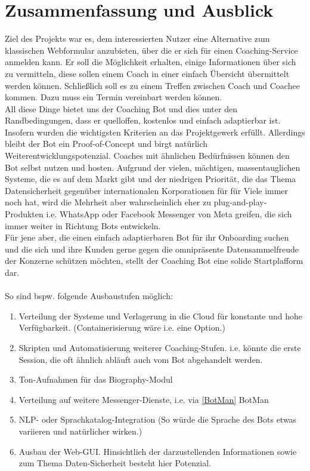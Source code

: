 \label{Zusammenfassung und Ausblick}
\chapter{Zusammenfassung und Ausblick}

    Ziel des Projekts war es, dem interessierten Nutzer eine Alternative zum klassischen Webformular anzubieten, über die er sich für einen Coaching-Service anmelden kann. Er soll die Möglichkeit erhalten, einige Informationen über sich zu vermitteln, diese sollen einem Coach in einer einfach Übersicht übermittelt werden können. Schließlich soll es zu einem Treffen zwischen Coach und Coachee kommen. Dazu muss ein Termin vereinbart werden können. \\
    All diese Dinge bietet uns der Coaching Bot und dies unter den Randbedingungen, dass er quelloffen, kostenlos und einfach adaptierbar ist. Insofern wurden die wichtigsten Kriterien an das Projektgewerk erfüllt. Allerdings bleibt der Bot ein Proof-of-Concept und birgt natürlich Weiterentwicklungspotenzial. Coaches mit ähnlichen Bedürfnissen können den Bot selbst nutzen und hosten. Aufgrund der vielen, mächtigen, massentauglichen Systeme, die es auf dem Markt gibt und der niedrigen Priorität, die das Thema Datensicherheit gegenüber internationalen Korporationen für für Viele immer noch hat, wird die Mehrheit aber wahrscheinlich eher zu plug-and-play-Produkten i.e. WhatsApp oder Facebook Messenger von Meta greifen, die sich immer weiter in Richtung Bots entwickeln. \\

    Für jene aber, die einen einfach adaptierbaren Bot für ihr Onboarding suchen und die sich und ihre Kunden gerne gegen die omnipräsente Datensammelfreude der Konzerne schützen möchten, stellt der Coaching Bot eine solide Startplafform dar. \\ \\

    So sind bspw. folgende Ausbaustufen möglich:

    \begin{enumerate}
        \item Verteilung der Systeme und Verlagerung in die Cloud für konstante und hohe Verfügbarkeit. (Containerisierung wäre i.e. eine Option.)
        \item Skripten und Automatisierung weiterer Coaching-Stufen. i.e. könnte die erste Session, die oft ähnlich abläuft auch vom Bot abgehandelt werden.
        \item Ton-Aufnahmen für das Biography-Modul
        \item Verteilung auf weitere Messenger-Dienste, i.e. via \ref{BotMan} BotMan
        \item NLP- oder Sprachkatalog-Integration (So würde die Sprache des Bots etwas variieren und natürlicher wirken.)
        \item Ausbau der Web-GUI. Hinsichtlich der darzustellenden Informationen sowie zum Thema Daten-Sicherheit besteht hier Potenzial.
    \end{enumerate}
